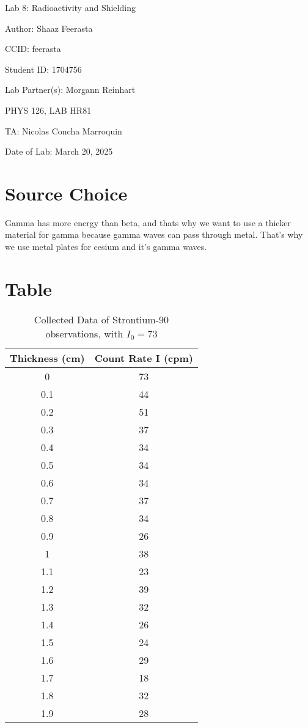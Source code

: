 \documentclass[12pt]{article}
\begin{document}
\pagebreak
\begin{titlepage}
    \begin{center}
        \vspace*{\fill}
        Lab 8: Radioactivity and Shielding

        Author: Shaaz Feerasta

        CCID: feerasta

        Student ID: 1704756

        Lab Partner(s): Morgann Reinhart

        PHYS 126, LAB HR81

        TA: Nicolas Concha Marroquin

        Date of Lab: March 20, 2025
        \vspace*{\fill}
    \end{center}
\end{titlepage}

\section{Source Choice}
Gamma has more energy than beta, and thats why we want to use a thicker material for gamma because gamma waves can pass through metal.
That's why we use metal plates for cesium and it's gamma waves.
\section{Table}

\begin{table}[H]
    \centering
    \begin{tabular}{cc}
        \toprule
        Thickness (cm) & Count Rate I (cpm) \\
        \midrule
        0   & 73 \\
        0.1 & 44 \\
        0.2 & 51 \\
        0.3 & 37 \\
        0.4 & 34 \\
        0.5 & 34 \\
        0.6 & 34 \\
        0.7 & 37 \\
        0.8 & 34 \\
        0.9 & 26 \\
        1   & 38 \\
        1.1 & 23 \\
        1.2 & 39 \\
        1.3 & 32 \\
        1.4 & 26 \\
        1.5 & 24 \\
        1.6 & 29 \\
        1.7 & 18 \\
        1.8 & 32 \\
        1.9 & 28 \\
        \bottomrule
    \end{tabular}
    \caption{Collected Data of Strontium-90 observations, with $I_0 = 73$}
    \label{tab:count_rate}
\end{table}
\end{document}
